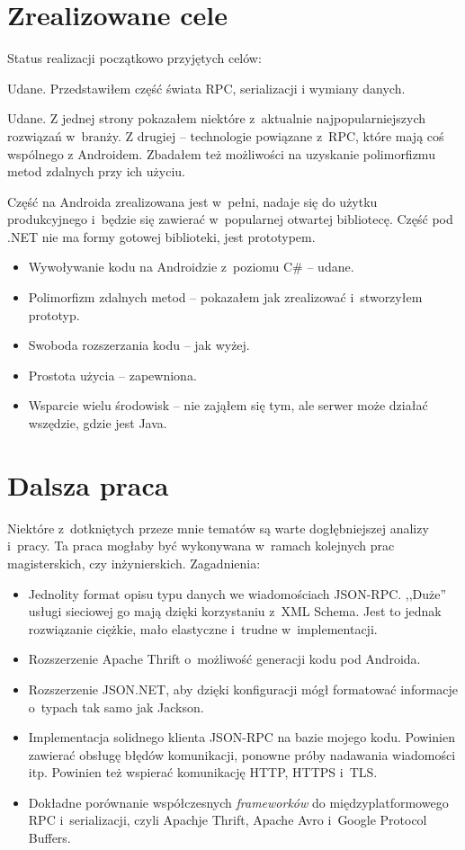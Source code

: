 \section{Zrealizowane cele}
Status realizacji początkowo przyjętych celów:
\begin{description}
Udane. Przedstawiłem część świata RPC, serializacji i wymiany danych.

Udane. Z jednej strony pokazałem niektóre z~aktualnie najpopularniejszych rozwiązań w~branży. Z drugiej -- technologie powiązane z~RPC, które mają coś wspólnego z Androidem.
Zbadałem też możliwości na uzyskanie polimorfizmu metod zdalnych przy ich użyciu.

Część na Androida zrealizowana jest w~pełni, nadaje się do użytku produkcyjnego i~będzie się zawierać w~popularnej otwartej bibliotecę.
Część pod .NET nie ma formy gotowej biblioteki, jest prototypem.
\begin{itemize}
  \item Wywoływanie kodu na Androidzie z~poziomu C\# -- udane.
	\item Polimorfizm zdalnych metod -- pokazałem jak zrealizować i~stworzyłem prototyp.
	\item Swoboda rozszerzania kodu -- jak wyżej.
	\item Prostota użycia -- zapewniona.
	\item Wsparcie wielu środowisk -- nie zająłem się tym, ale serwer może działać wszędzie, gdzie jest Java.
\end{itemize}

\end{description}



\section{Dalsza praca}
Niektóre z~dotkniętych przeze mnie tematów są warte dogłębniejszej analizy i~pracy.
Ta praca mogłaby być wykonywana w~ramach kolejnych prac magisterskich, czy inżynierskich.
Zagadnienia:
\begin{itemize}
	\item Jednolity format opisu typu danych we wiadomościach JSON-RPC. ,,Duże'' usługi sieciowej go mają dzięki korzystaniu z~XML Schema. Jest to jednak rozwiązanie ciężkie, mało elastyczne i~trudne w~implementacji.
	\item Rozszerzenie Apache Thrift o~możliwość generacji kodu pod Androida.
	\item Rozszerzenie JSON.NET, aby dzięki konfiguracji mógł formatować informacje o~typach tak samo jak Jackson.
	\item Implementacja solidnego klienta JSON-RPC na bazie mojego kodu. Powinien zawierać obsługę błędów komunikacji, ponowne próby nadawania wiadomości itp. Powinien też wspierać komunikację HTTP, HTTPS i~TLS.
	\item Dokładne porównanie współczesnych \emph{frameworków} do międzyplatformowego RPC i~serializacji, czyli Apachje Thrift, Apache Avro i~Google Protocol Buffers.
\end{itemize}


